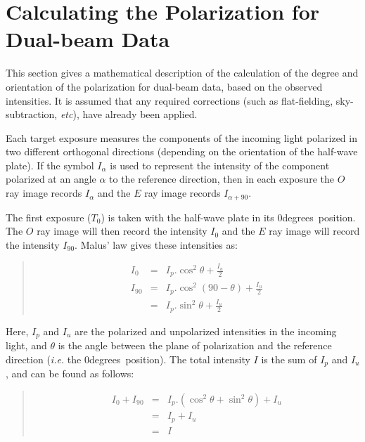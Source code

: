 \documentclass[twoside,11pt]{article}
\newcommand{\xlabel}[1]{}
\renewcommand{\_}{\texttt{\symbol{95}}}
\newenvironment{myquote}{\begin{quote}\begin{small}}{\end{small}\end{quote}}
\newcommand{\dgs}{\hbox{$^\circ$}}
\renewcommand{\dgs}{degrees}
\begin{document}
\section{\label{APP:POL}\xlabel{calculatingthepolarization}Calculating the Polarization for Dual-beam Data}
This section gives a mathematical description of the calculation of the
degree and orientation of the polarization for dual-beam data, based on
the observed intensities. It is assumed that any required corrections
(such as flat-fielding, sky-subtraction, \emph{etc}), have already been
applied.

Each target exposure measures the components of the incoming light
polarized in two different orthogonal directions (depending on the
orientation of the half-wave plate). If the symbol $I_{\alpha}$ is used
to represent the intensity of the component polarized at an angle
$\alpha$ to the reference direction, then in each exposure the $O$ ray
image records $I_{\alpha}$ and the $E$ ray image records $I_{\alpha+90}$.

The first exposure ($T_{0}$) is taken with the half-wave plate in its 0\dgs\
position. The $O$ ray image will then record the intensity $I_{0}$ and
the $E$ ray image will record the intensity $I_{90}$. Malus' law gives
these intensities as:

\begin{myquote}
\begin{eqnarray*}
  I_{0} & = & I_{p}.\cos^{2}\theta + \frac{I_{u}}{2} \\
 I_{90} & = & I_{p}.\cos^{2}(90 - \theta) + \frac{I_{u}}{2} \\
        & = & I_{p}.\sin^{2}\theta + \frac{I_{u}}{2}
\end{eqnarray*}
\end{myquote}

Here, $I_{p}$ and $I_{u}$ are the polarized and unpolarized intensities
in the incoming light, and $\theta$ is the angle between the plane of
polarization and the reference direction (\emph{i.e.} the 0\dgs\ position). The
total intensity $I$ is the sum of $I_{p}$ and $I_{u}$, and can be found
as follows:
\begin{myquote}
\begin{eqnarray*}
  I_{0} + I_{90} & = & I_{p}.(\cos^{2}\theta + \sin^{2}\theta) + I_{u} \\
                 & = & I_{p} + I_{u} \\
                 & = & I
\end{eqnarray*}
\end{myquote}
\end{document}
